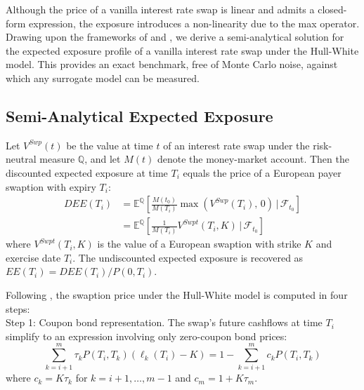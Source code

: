   \noindent
  Although the price of a vanilla interest rate swap is linear and admits a closed-form expression, the exposure introduces a non-linearity due to the max operator. Drawing upon the
  frameworks of \cite{sorensen1994pricing} and \cite{jamshidian1989exact}, we derive a semi-analytical solution for the expected exposure profile of a vanilla interest rate swap under the
  Hull-White model. This provides an exact benchmark, free of Monte Carlo noise, against which any surrogate model can be measured. 

  \subsection{Semi-Analytical Expected Exposure}

  \begin{lemma}\label{lem:swapEE_equivalent_swaption}
  Let $V^{Swp}(t)$ be the value at time $t$ of an interest rate swap under the risk-neutral measure $\mathbb{Q}$, and let $M(t)$ denote the money-market account. Then the discounted expected
   exposure at time $T_i$ equals the price of a European payer swaption with expiry $T_i$:
  \begin{align*}
      DEE(T_i) &= \mathbb{E}^{\mathbb{Q}} \left[ \frac{M(t_0)}{M(T_i)} \max\!\left(V^{Swp}(T_i),\, 0\right) \,\Big|\, \mathcal{F}_{t_0} \right] \\
      &= \mathbb{E}^{\mathbb{Q}} \left[ \frac{1}{M(T_i)} V^{Swpt}(T_i, K) \,\Big|\, \mathcal{F}_{t_0} \right]
  \end{align*}
  where $V^{Swpt}(T_i, K)$ is the value of a European swaption with strike $K$ and exercise date $T_i$. The undiscounted expected exposure is recovered as $EE(T_i) = DEE(T_i) / P(0, T_i)$.
  \end{lemma}

  \noindent
  Following \cite{jamshidian1989exact}, the swaption price under the Hull-White model is computed in four steps:\\
  
  \noindent
  Step 1: Coupon bond representation. The swap's future cashflows at time $T_i$ simplify to an expression involving only zero-coupon bond prices:
  \begin{equation}
      \sum_{k=i+1}^{m} \tau_k P(T_i, T_k)\left(\ell_k(T_i) - K\right) = 1 - \sum_{k=i+1}^{m} c_k P(T_i, T_k)
  \end{equation}
  where $c_k = K\tau_k$ for $k = i+1, \ldots, m-1$ and $c_m = 1 + K\tau_m$.\\

